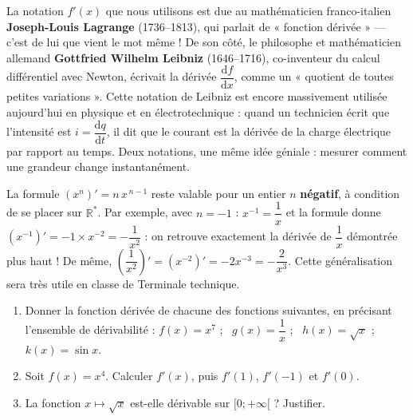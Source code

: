 \documentclass[11pt]{article}
\begin{document}
\begin{savaistu}
La notation $f'(x)$ que nous utilisons est due au mathématicien franco-italien \textbf{Joseph-Louis Lagrange} (1736--1813), qui parlait de « fonction dérivée » — c'est de lui que vient le mot même ! De son côté, le philosophe et mathématicien allemand \textbf{Gottfried Wilhelm Leibniz} (1646--1716), co-inventeur du calcul différentiel avec Newton, écrivait la dérivée $\dfrac{\mathrm{d}f}{\mathrm{d}x}$, comme un « quotient de toutes petites variations ». Cette notation de Leibniz est encore massivement utilisée aujourd'hui en physique et en électrotechnique : quand un technicien écrit que l'intensité est $i = \dfrac{\mathrm{d}q}{\mathrm{d}t}$, il dit que le courant est la dérivée de la charge électrique par rapport au temps. Deux notations, une même idée géniale : mesurer comment une grandeur change instantanément.
\end{savaistu}

\begin{savaistu}
La formule $\left(x^n\right)' = n\,x^{\,n-1}$ reste valable pour un entier $n$ \textbf{négatif}, à condition de se placer sur $\mathbb{R}^*$. Par exemple, avec $n = -1$ : $x^{-1} = \dfrac{1}{x}$ et la formule donne $\left(x^{-1}\right)' = -1 \times x^{-2} = -\dfrac{1}{x^2}$ : on retrouve exactement la dérivée de $\dfrac{1}{x}$ démontrée plus haut ! De même, $\left(\dfrac{1}{x^2}\right)' = \left(x^{-2}\right)' = -2x^{-3} = -\dfrac{2}{x^3}$. Cette généralisation sera très utile en classe de Terminale technique.
\end{savaistu}

\begin{exercice}[À faire]
\begin{enumerate}
\item Donner la fonction dérivée de chacune des fonctions suivantes, en précisant l'ensemble de dérivabilité : $f(x) = x^7$ ; \ $g(x) = \dfrac{1}{x}$ ; \ $h(x) = \sqrt{x}$ ; \ $k(x) = \sin x$.
\item Soit $f(x) = x^4$. Calculer $f'(x)$, puis $f'(1)$, $f'(-1)$ et $f'(0)$.
\item La fonction $x \mapsto \sqrt{x}$ est-elle dérivable sur $[0 ; +\infty[$ ? Justifier.
\end{enumerate}
\end{exercice}
\end{document}
